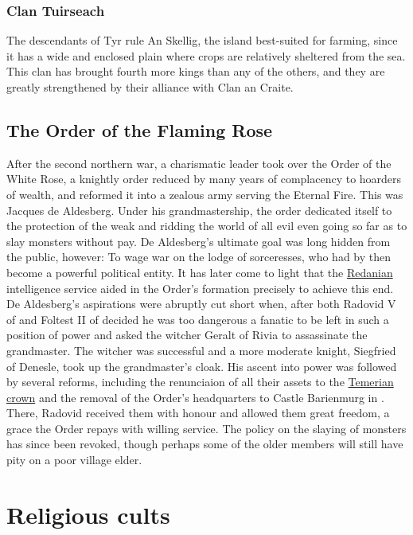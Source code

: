 \documentclass[parskip=full,11pt,%
footheight=38pt]{scrreport}
\begin{document}
\subsubsection{Clan Tuirseach}
The descendants of Tyr rule An Skellig, the island best-suited for farming, since it has a wide and enclosed plain where crops are relatively sheltered from the
sea. This clan has brought fourth more kings than any of the others, and they are greatly strengthened by their alliance with Clan an Craite.

\subsection{The Order of the Flaming Rose}\label{group:flaming-rose}
After the second northern war, a charismatic leader took over the Order of the White Rose, 
a knightly order reduced by many years of complacency to hoarders of wealth, and reformed
it into a zealous army serving the Eternal Fire. This was Jacques de Aldesberg. Under his
grandmastership, the order dedicated itself to the protection of the weak and ridding the
world of all evil \textendash even going so far as to slay monsters without pay. De Aldesberg's
ultimate goal was long hidden from the public, however: To wage war on the lodge of sorceresses,
who had by then become a powerful political entity. It has later come to light that the
\hyperref[realm:redania]{Redanian} intelligence service aided in the Order's formation precisely
to achieve this end.
\\[2ex]
De Aldesberg's aspirations were abruptly cut short when, after both Radovid V of 
and Foltest II of  decided he was too dangerous a fanatic to be left in such a
position of power and asked the witcher Geralt of Rivia to assassinate the grandmaster. The witcher
was successful and a more moderate knight, Siegfried of Denesle, took up the grandmaster's cloak.
His ascent into power was followed by several reforms, including the renunciaion of all their assets
to the \hyperref[realm:temeria]{Temerian crown} and the removal of the Order's headquarters to
Castle Barienmurg in . There, Radovid received them with honour and 
allowed them great freedom, a grace the Order repays with willing service. The policy on the 
slaying of monsters has since been revoked, though perhaps some of the older members will still 
have pity on a poor village elder. 

\section{Religious cults}
\end{document}
